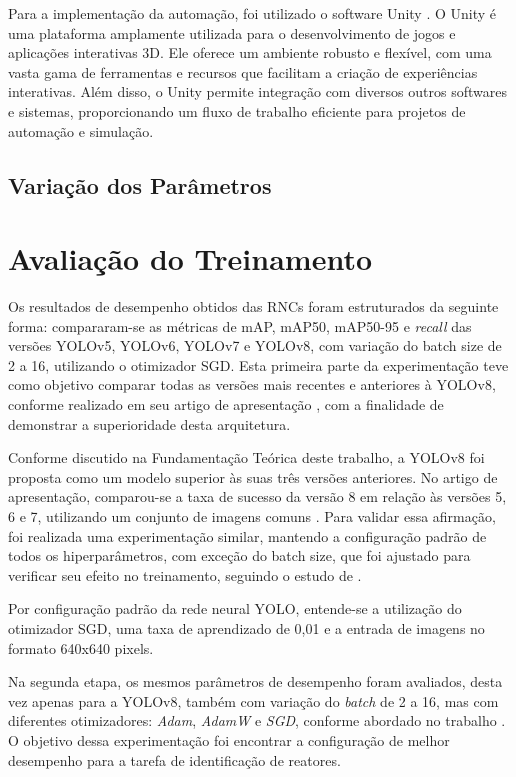 Para a implementação da automação, foi utilizado o software Unity \cite{unity}. O Unity é uma plataforma amplamente utilizada para o desenvolvimento de jogos e aplicações interativas 3D. Ele oferece um ambiente robusto e flexível, com uma vasta gama de ferramentas e recursos que facilitam a criação de experiências interativas. Além disso, o Unity permite integração com diversos outros softwares e sistemas, proporcionando um fluxo de trabalho eficiente para projetos de automação e simulação.

\subsection{Variação dos Parâmetros}

\section{Avaliação do Treinamento} 

Os resultados de desempenho obtidos das RNCs foram estruturados da seguinte forma: compararam-se as métricas de mAP, mAP50, mAP50-95 e \textit{recall} das versões YOLOv5, YOLOv6, YOLOv7 e YOLOv8, com variação do batch size de 2 a 16, utilizando o otimizador SGD. Esta primeira parte da experimentação teve como objetivo comparar todas as versões mais recentes e anteriores à YOLOv8, conforme realizado em seu artigo de apresentação \cite{ultralytics2023yolo}, com a finalidade de demonstrar a superioridade desta arquitetura.

Conforme discutido na Fundamentação Teórica deste trabalho, a YOLOv8 foi proposta como um modelo superior às suas três versões anteriores. No artigo de apresentação, comparou-se a taxa de sucesso da versão 8 em relação às versões 5, 6 e 7, utilizando um conjunto de imagens comuns \cite{ultralytics2023yolo}. Para validar essa afirmação, foi realizada uma experimentação similar, mantendo a configuração padrão de todos os hiperparâmetros, com exceção do batch size, que foi ajustado para verificar seu efeito no treinamento, seguindo o estudo de \cite{gonzaga2023identificaccao}.

Por configuração padrão da rede neural YOLO, entende-se a utilização do otimizador SGD, uma taxa de aprendizado de 0,01 e a entrada de imagens no formato 640x640 pixels.

Na segunda etapa, os mesmos parâmetros de desempenho foram avaliados, desta vez apenas para a YOLOv8, também com variação do \textit{batch} de 2 a 16, mas com diferentes otimizadores: \textit{Adam}, \textit{AdamW} e \textit{SGD}, conforme abordado no trabalho \cite{gonzaga2023identificaccao}. O objetivo dessa experimentação foi encontrar a configuração de melhor desempenho para a tarefa de identificação de reatores.

